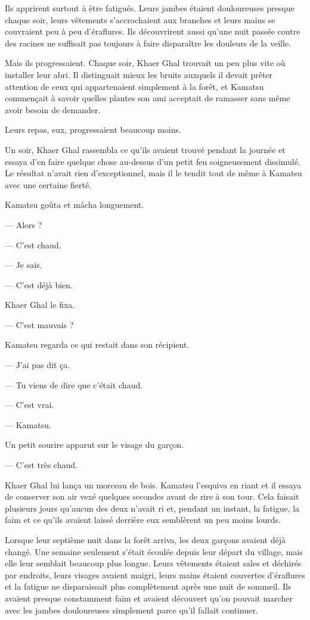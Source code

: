 Ils apprirent surtout à être fatigués. Leurs jambes étaient douloureuses presque
chaque soir, leurs vêtements s'accrochaient aux branches et leurs mains se
couvraient peu à peu d'éraflures. Ils découvrirent aussi qu'une nuit passée
contre des racines ne suffisait pas toujours à faire disparaître les douleurs
de la veille.

Mais ils progressaient. Chaque soir, Khaer Ghal trouvait un peu plus vite où
installer leur abri. Il distinguait mieux les bruits auxquels il devait prêter
attention de ceux qui appartenaient simplement à la forêt, et Kamatsu commençait
à savoir quelles plantes son ami acceptait de ramasser sans même avoir besoin
de demander.

Leurs repas, eux, progressaient beaucoup moins.

Un soir, Khaer Ghal rassembla ce qu'ils avaient trouvé pendant la journée et
essaya d'en faire quelque chose au-dessus d'un petit feu soigneusement
dissimulé. Le résultat n'avait rien d'exceptionnel, mais il le tendit tout de
même à Kamatsu avec une certaine fierté.

Kamatsu goûta et mâcha longuement.

— Alors ?

— C'est chaud.

— Je sais.

— C'est déjà bien.

Khaer Ghal le fixa.

— C'est mauvais ?

Kamatsu regarda ce qui restait dans son récipient.

— J'ai pas dit ça.

— Tu viens de dire que c'était chaud.

— C'est vrai.

— Kamatsu.

Un petit sourire apparut sur le visage du garçon.

— C'est très chaud.

Khaer Ghal lui lança un morceau de bois. Kamatsu l'esquiva en riant et il
essaya de conserver son air vexé quelques secondes avant de rire à son tour.
Cela faisait plusieurs jours qu'aucun des deux n'avait ri et, pendant un
instant, la fatigue, la faim et ce qu'ils avaient laissé derrière eux semblèrent
un peu moins lourds.

\scenebreak

Lorsque leur septième nuit dans la forêt arriva, les deux garçons avaient déjà
changé. Une semaine seulement s'était écoulée depuis leur départ du village,
mais elle leur semblait beaucoup plus longue. Leurs vêtements étaient sales et
déchirés par endroits, leurs visages avaient maigri, leurs mains étaient
couvertes d'éraflures et la fatigue ne disparaissait plus complètement après
une nuit de sommeil. Ils avaient presque constamment faim et avaient découvert
qu'on pouvait marcher avec les jambes douloureuses simplement parce qu'il
fallait continuer.

